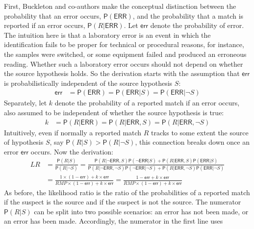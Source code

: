 \documentclass[
  letterpaper,
  DIV=11,
  numbers=noendperiod]{scrartcl}
\newcommand{\n}{\neg}
\newcommand{\pr}[1]{\mathsf{P}(#1)}
\begin{document}
First, Buckleton and co-authors make the conceptual distinction between
the probability that an error occurs, \(\pr{\mathsf{ERR}}\), and the
probability that a match is reported if an error occurs,
\(\pr{R \vert \mathsf{ERR}}\). Let \(\mathsf{err}\) denote the
probability of error. The intuition here is that a laboratory error is
an event in which the identification fails to be proper for technical or
procedural reasons, for instance, the samples were switched, or some
equipment failed and produced an erroneous reading. Whether such a
laboratory error occurs should not depend on whether the source
hypothesis holds. So the derivation starts with the assumption that
\(\mathsf{err}\) is probabilistically independent of the source
hypothesis \(S\):\\
\begin{align*}
\mathsf{err} & = \pr{\mathsf{ERR}} = \pr{\mathsf{ERR} \vert S} = \pr{\mathsf{ERR} \vert \n S}
\end{align*} \noindent  Separately, let \(k\) denote the probability of
a reported match if an error occurs, also assumed to be independent of
whether the source hypothesis is true: \begin{align*}
k & = \pr{R \vert \mathsf{ERR}} = \pr{R \vert \mathsf{ERR}, S} = \pr{R \vert \mathsf{ERR}, \n S}
\end{align*} \noindent  Intuitively, even if normally a reported match
\(R\) tracks to some extent the source of hypothesis \(S\), say
\(\pr{R \vert S}>\pr{R \vert \neg S}\), this connection breaks down once
an error \(\mathsf{err}\) occurs. Now the derivation: \begin{align*}
LR & = \frac{\pr{R\vert S}}
{\pr{R \vert \n S}} = \frac{\pr{R \vert \n \mathsf{ERR}, S}\pr{\n \mathsf{ERR} \vert S} + \pr{R \vert\mathsf{ERR}, S}\pr{\mathsf{ERR} \vert S}}
{\pr{R \vert \n \mathsf{ERR}, \n S}\pr {\n \mathsf{ERR} \vert \n S} + \pr{R \vert \mathsf{ERR}, \n S}\pr{\mathsf{ERR} \vert \n S}}\\
& = \frac{1\times (1-\mathsf{err}) + k\times \mathsf{err}}
{RMP\times (1-\mathsf{err})+k\times \mathsf{err}}  = \frac{1-\mathsf{err}+k\times \mathsf{err}}{RMP\times (1-\mathsf{err})+k\times \mathsf{err}}
\end{align*} \noindent As before, the likelihood ratio is the ratio of
the probabilities of a reported match if the suspect is the source and
if the suspect is not the source. The numerator \(\pr{R\vert S}\) can be
split into two possible scenarios: an error has not been made, or an
error has been made. Accordingly, the numerator in the first line uses
\end{document}

